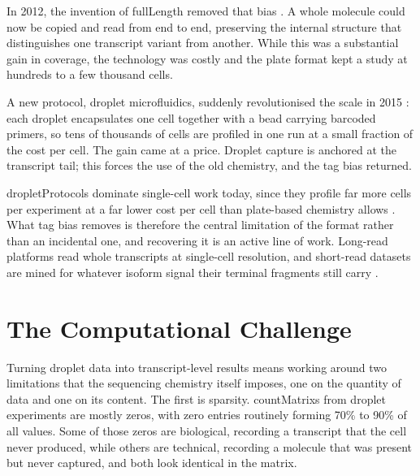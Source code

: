In 2012, the invention of \gls{fullLength} removed that bias \cite{ramskold2012full, picelli2013smart}. A whole molecule could now be copied and read from end to end, preserving the internal structure that distinguishes one transcript variant from another. While this was a substantial gain in coverage, the technology was costly and the plate format kept a study at hundreds to a few thousand cells.

A new protocol, droplet microfluidics, suddenly revolutionised the scale in 2015 \cite{zheng2017massively}: each droplet encapsulates one cell together with a bead carrying barcoded primers, so tens of thousands of cells are profiled in one run at a small fraction of the cost per cell. The gain came at a price. Droplet capture is anchored at the transcript tail; this forces the use of the old chemistry, and the tag bias returned.

\Gls{dropletProtocols} dominate single-cell work today, since they profile far more cells per experiment at a far lower cost per cell than plate-based chemistry allows \cite{conte2024opportunities}. What tag bias removes is therefore the central limitation of the format rather than an incidental one, and recovering it is an active line of work. Long-read platforms read whole transcripts at single-cell resolution, and short-read datasets are mined for whatever isoform signal their terminal fragments still carry \cite{joglekar2023words}.

\section{The Computational Challenge}
Turning droplet data into transcript-level results means working around two limitations that the sequencing chemistry itself imposes, one on the quantity of data and one on its content. The first is sparsity. \Glspl{countMatrix} from droplet experiments are mostly zeros, with zero entries routinely forming 70\% to 90\% of all values. Some of those zeros are biological, recording a transcript that the cell never produced, while others are technical, recording a molecule that was present but never captured, and both look identical in the matrix.

